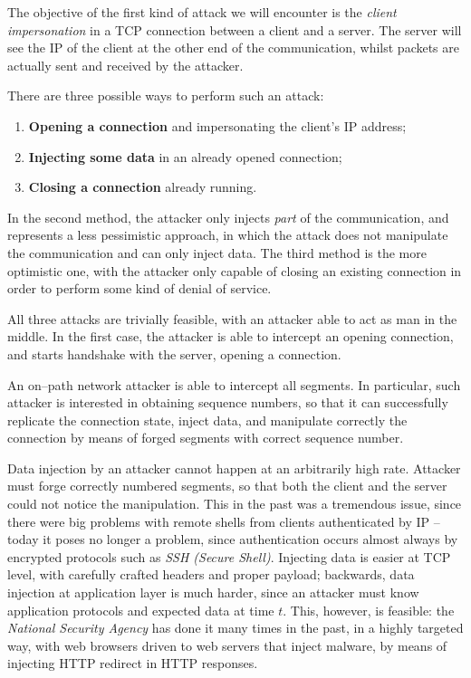\documentclass[10pt]{extbook}
\begin{document}
The objective of the first kind of attack we will encounter is the \emph{client
impersonation} in a TCP connection between a client and a server. The server
will see the IP of the client at the other end of the communication, whilst
packets are actually sent and received by the attacker.

There are three possible ways to perform such an attack:
\begin{enumerate}
    \item \textbf{Opening a connection} and impersonating the client's IP
        address;
    \item \textbf{Injecting some data} in an already opened connection;
    \item \textbf{Closing a connection} already running.
\end{enumerate}

In the second method, the attacker only injects \emph{part} of the
communication, and represents a less pessimistic approach, in which the attack
does not manipulate the communication and can only inject data. The third
method is the more optimistic one, with the attacker only capable of closing an
existing connection in order to perform some kind of denial of service.

All three attacks are trivially feasible, with an attacker able to act as man
in the middle. In the first case, the attacker is able to intercept an opening
connection, and starts handshake with the server, opening a connection.

An on--path network attacker is able to intercept all segments. In particular,
such attacker is interested in obtaining sequence numbers, so that it can
successfully replicate the connection state, inject data, and manipulate
correctly the connection by means of forged segments with correct sequence
number.

Data injection by an attacker cannot happen at an arbitrarily high rate.
Attacker must forge correctly numbered segments, so that both the client and
the server could not notice the manipulation. This in the past was a tremendous
issue, since there were big problems with remote shells from clients
authenticated by IP -- today it poses no longer a problem, since authentication
occurs almost always by encrypted protocols such as \emph{SSH (Secure Shell)}.
Injecting data is easier at TCP level, with carefully crafted headers and
proper payload; backwards, data injection at application layer is much harder,
since an attacker must know application protocols and expected data at time
$t$. This, however, is feasible: the \emph{National Security Agency} has done
it many times in the past, in a highly targeted way, with web browsers driven
to web servers that inject malware, by means of injecting HTTP redirect in HTTP
responses.
\end{document}
